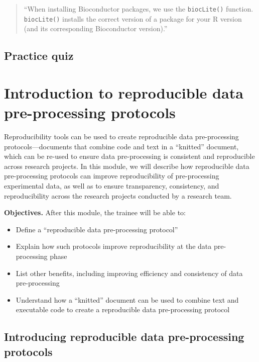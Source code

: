 \documentclass[]{tufte-book}
\providecommand{\tightlist}{%
  \setlength{\itemsep}{0pt}\setlength{\parskip}{0pt}}
\begin{document}
\begin{quote}
``When installing Bioconductor packages, we use the \texttt{biocLite()} function. \texttt{biocLite()}
installs the correct version of a package for your R version (and its corresponding
Bioconductor version).'' \citep{buffalo2015bioinformatics}
\end{quote}

\subsection{Practice quiz}\label{practice-quiz-1}

\section{Introduction to reproducible data pre-processing protocols}\label{module18}

Reproducibility tools can be used to create reproducible data pre-processing
protocols---documents that combine code and text in a ``knitted'' document, which
can be re-used to ensure data pre-processing is consistent and reproducible
across research projects. In this module, we will describe how reproducible data
pre-processing protocols can improve reproducibility of pre-processing
experimental data, as well as to ensure transparency, consistency, and
reproducibility across the research projects conducted by a research team.

\textbf{Objectives.} After this module, the trainee will be able to:

\begin{itemize}
\tightlist
\item
  Define a ``reproducible data pre-processing protocol''
\item
  Explain how such protocols improve reproducibility at the data pre-processing
  phase
\item
  List other benefits, including improving efficiency and consistency of data
  pre-processing
\item
  Understand how a ``knitted'' document can be used to combine text and
  executable code to create a reproducible data pre-processing protocol
\end{itemize}

\subsection{Introducing reproducible data pre-processing protocols}\label{introducing-reproducible-data-pre-processing-protocols}
\end{document}
